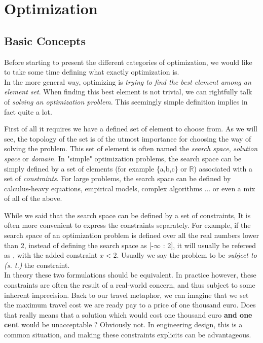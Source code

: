 \chapter{Optimization}

\section{Basic Concepts}

Before starting to present the different categories of optimization, we would like to take some time defining what exactly optimization is.\\
In the more general way, optimizing is \emph{trying to find the best element among an element set}. When finding this best element is not trivial, we can rightfully talk of \emph{solving an optimization problem}. This seemingly simple definition implies in fact quite a lot.

First of all it requires we have a defined set of element to choose from. As we will see, the topology of the set is of the utmost importance for choosing the way of solving the problem. This set of element is often named the \emph{search space}, \emph{solution space} or \emph{domain}. In "simple" optimization problems, the search space can be simply defined by a set of elements (for example \{a,b,c\} or \ensuremath{\mathbb{R}}) associated with a set of \emph{constraints}. For large problems, the search space can be defined by calculus-heavy equations, empirical models, complex algorithms ... or even a mix of all of the above.


While we said that the search space can be defined by a set of constraints, It is often more convenient to express the constraints separately. For example, if the search space of an optimization problem is defined over all the real numbers lower than 2, instead of defining the search space as [-\(\infty\) : 2], it will usually be refereed as , with the added constraint \(x < 2\). Usually we say the problem to be \emph{subject to (s. t.)} the constraint.\\
In theory these two formulations should be equivalent. In practice however, these constraints are often the result of a real-world concern, and thus subject to some inherent imprecision. Back to our travel metaphor, we can imagine that we set the maximum travel cost we are ready pay to a price of one thousand euro. Does that really means that a solution which would cost one thousand euro \textbf{and one cent} would be unacceptable ? Obviously not.  In engineering design, this is a common situation, and making these constraints explicits can be advantageous.


